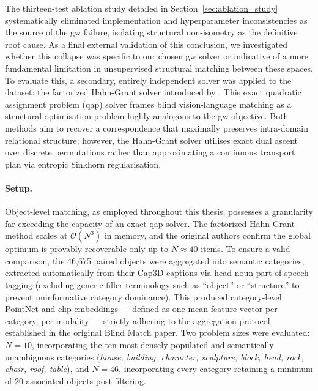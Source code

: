 The thirteen-test ablation study detailed in Section~\ref{sec:ablation_study} systematically eliminated implementation and hyperparameter inconsistencies as the source of the \gls{gw} failure, isolating structural non-isometry as the definitive root cause. As a final external validation of this conclusion, we investigated whether this collapse was specific to our chosen \gls{gw} solver or indicative of a more fundamental limitation in unsupervised structural matching between these spaces. To evaluate this, a secondary, entirely independent solver was applied to the dataset: the factorized Hahn-Grant solver introduced by \textcite{schnaus2025blind}. This exact quadratic assignment problem (\gls{qap}) solver frames blind vision-language matching as a structural optimisation problem highly analogous to the \gls{gw} objective. Both methods aim to recover a correspondence that maximally preserves intra-domain relational structure; however, the Hahn-Grant solver utilises exact dual ascent over discrete permutations rather than approximating a continuous transport plan via entropic Sinkhorn regularisation.

\paragraph{Setup.} Object-level matching, as employed throughout this thesis, possesses a granularity far exceeding the capacity of an exact \gls{qap} solver. The factorized Hahn-Grant method scales at $\mathcal{O}(N^3)$ in memory, and the original authors confirm the global optimum is provably recoverable only up to $N \approx 40$ items. To ensure a valid comparison, the 46,675 paired objects were aggregated into semantic categories, extracted automatically from their Cap3D captions via head-noun part-of-speech tagging (excluding generic filler terminology such as ``object'' or ``structure'' to prevent uninformative category dominance). This produced category-level PointNet and \gls{clip} embeddings --- defined as one mean feature vector per category, per modality --- strictly adhering to the aggregation protocol established in the original Blind Match paper. Two problem sizes were evaluated: $N=10$, incorporating the ten most densely populated and semantically unambiguous categories (\textit{house, building, character, sculpture, block, head, rock, chair, roof, table}), and $N=46$, incorporating every category retaining a minimum of 20 associated objects post-filtering.

